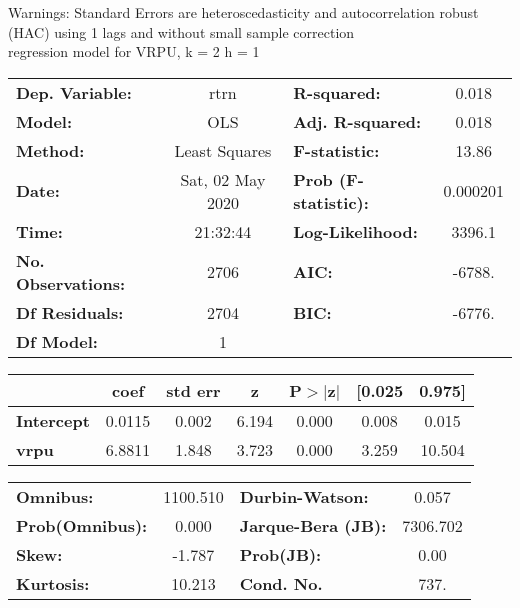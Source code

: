 Warnings: \newline
 [1] Standard Errors are heteroscedasticity and autocorrelation robust (HAC) using 1 lags and without small sample correction\\ 

regression model for VRPU, k = 2 h = 1\begin{center}
\begin{tabular}{lclc}
\toprule
\textbf{Dep. Variable:}    &       rtrn       & \textbf{  R-squared:         } &     0.018   \\
\textbf{Model:}            &       OLS        & \textbf{  Adj. R-squared:    } &     0.018   \\
\textbf{Method:}           &  Least Squares   & \textbf{  F-statistic:       } &     13.86   \\
\textbf{Date:}             & Sat, 02 May 2020 & \textbf{  Prob (F-statistic):} &  0.000201   \\
\textbf{Time:}             &     21:32:44     & \textbf{  Log-Likelihood:    } &    3396.1   \\
\textbf{No. Observations:} &        2706      & \textbf{  AIC:               } &    -6788.   \\
\textbf{Df Residuals:}     &        2704      & \textbf{  BIC:               } &    -6776.   \\
\textbf{Df Model:}         &           1      & \textbf{                     } &             \\
\bottomrule
\end{tabular}
\begin{tabular}{lcccccc}
                   & \textbf{coef} & \textbf{std err} & \textbf{z} & \textbf{P$> |$z$|$} & \textbf{[0.025} & \textbf{0.975]}  \\
\midrule
\textbf{Intercept} &       0.0115  &        0.002     &     6.194  &         0.000        &        0.008    &        0.015     \\
\textbf{vrpu}      &       6.8811  &        1.848     &     3.723  &         0.000        &        3.259    &       10.504     \\
\bottomrule
\end{tabular}
\begin{tabular}{lclc}
\textbf{Omnibus:}       & 1100.510 & \textbf{  Durbin-Watson:     } &    0.057  \\
\textbf{Prob(Omnibus):} &   0.000  & \textbf{  Jarque-Bera (JB):  } & 7306.702  \\
\textbf{Skew:}          &  -1.787  & \textbf{  Prob(JB):          } &     0.00  \\
\textbf{Kurtosis:}      &  10.213  & \textbf{  Cond. No.          } &     737.  \\
\bottomrule
\end{tabular}
\end{center}

